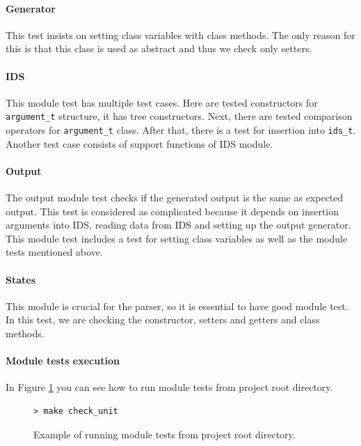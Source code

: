 \paragraph{Generator}
This test insists on setting class variables with class methods. The only reason
for this is that this class is used as abstract and thus we check only setters.

\paragraph{IDS}
This module test has multiple test cases. Here are tested constructors for
\texttt{argument\_t} structure, it has tree constructors. Next, there are tested
comparison operators for \texttt{argument\_t} class. After that, there is a test
for insertion into \texttt{ids\_t}. Another test case consists of support
functions of IDS module.

\paragraph{Output}
The output module test checks if the generated output is the same as expected
output. This test is considered as complicated because it depends on insertion
arguments into IDS, reading data from IDS and setting up the output generator.
This module test includes a test for setting class variables as well as the
module tests mentioned above.

\paragraph{States}
This module is crucial for the parser, so it is essential to have good module
test. In this test, we are checking the constructor, setters and getters and
class methods.

\paragraph{Module tests execution}
In Figure \ref{exec/unit_tests} you can see how to run module tests from project
root directory.

\begin{figure}[h]
	\lstset{style=npl}
\begin{lstlisting}
> make check_unit
\end{lstlisting}
	\caption{Example of running module tests from project root directory.}
	\label{exec/unit_tests}
\end{figure}

